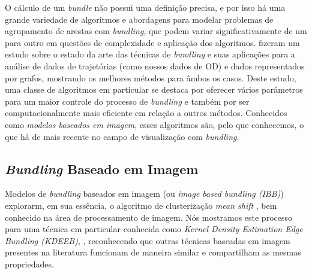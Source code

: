 O cálculo de um \emph{bundle} não possui uma definição precisa, e por isso há
uma grande variedade de algoritmos e abordagens para modelar problemas de
agrupamento de arestas com \emph{bundling}, que podem variar significativamente
de um para outro em questões de complexidade e aplicação dos algoritmos.
\citet{Lhuillier2017} fizeram um estudo sobre o estado da arte das técnicas de
\emph{bundling} e suas aplicações para a análise de dados de trajetórias (como
nossos dados de OD) e dados representados por grafos, mostrando os melhores
métodos para âmbos os casos. Deste estudo, uma classe de algoritmos em particular
se destaca por oferecer vários parâmetros para um maior controle do processo de \emph{bundling}
e também por ser computacionalmente mais eficiente em relação a outros métodos. Conhecidos
como \emph{modelos baseados em imagem}, esses algoritmos são, pelo que conhecemos,
o que há de mais recente no campo de visualização com \emph{bundling}.

\subsection{\emph{Bundling} Baseado em Imagem}
\label{sec:modelo-imagem}

Modelos de \emph{bundling} baseados em imagem (ou \emph{image based bundling
(IBB)}) explorarm, em sua essência, o algoritmo de clusterização \emph{mean
shift} \citep{comaniciu02}, bem conhecido na área de processamento de imagem.
Nós mostramos este processo para uma técnica em particular conhecida como
\emph{Kernel Density Estimation Edge Bundling (KDEEB)}, \citep{hurter:12},
reconhecendo que outras técnicas baseadas em imagem presentes na literatura
funcionam de maneira similar e compartilham as mesmas propriedades.

